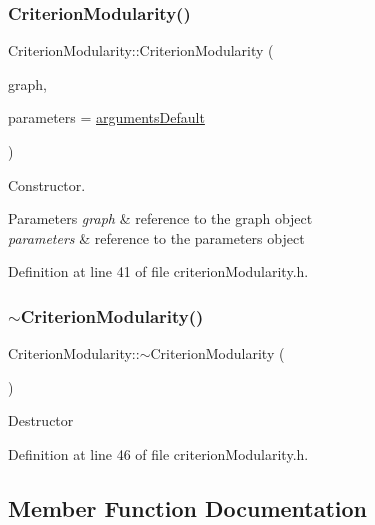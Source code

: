 \subsubsection{\texorpdfstring{Criterion\+Modularity()}{CriterionModularity()}}
{\footnotesize\ttfamily Criterion\+Modularity\+::\+Criterion\+Modularity (\begin{DoxyParamCaption}\item[{const \hyperlink{classGraphUndirectedGroupable}{Graph\+Undirected\+Groupable} \&}]{graph,  }\item[{const \hyperlink{structProgramParameters}{Program\+Parameters} \&}]{parameters = {\ttfamily \hyperlink{program_8h_ae2d819404495f80f31db7676c1329d19}{arguments\+Default}} }\end{DoxyParamCaption})\hspace{0.3cm}{\ttfamily [inline]}}

Constructor.


\begin{DoxyParams}{Parameters}
{\em graph} & reference to the graph object \\
\hline
{\em parameters} & reference to the parameters object \\
\hline
\end{DoxyParams}


Definition at line 41 of file criterion\+Modularity.\+h.

\mbox{\label{classCriterionModularity_a37d3f5ffcf397ec89e63c24705860496}} 
\subsubsection{\texorpdfstring{$\sim$\+Criterion\+Modularity()}{~CriterionModularity()}}
{\footnotesize\ttfamily Criterion\+Modularity\+::$\sim$\+Criterion\+Modularity (\begin{DoxyParamCaption}{ }\end{DoxyParamCaption})\hspace{0.3cm}{\ttfamily [inline]}}

Destructor 

Definition at line 46 of file criterion\+Modularity.\+h.



\subsection{Member Function Documentation}
\mbox{\label{classCriterionModularity_a181617050bab1eeaaf38b2ad30dcfc43}} 
